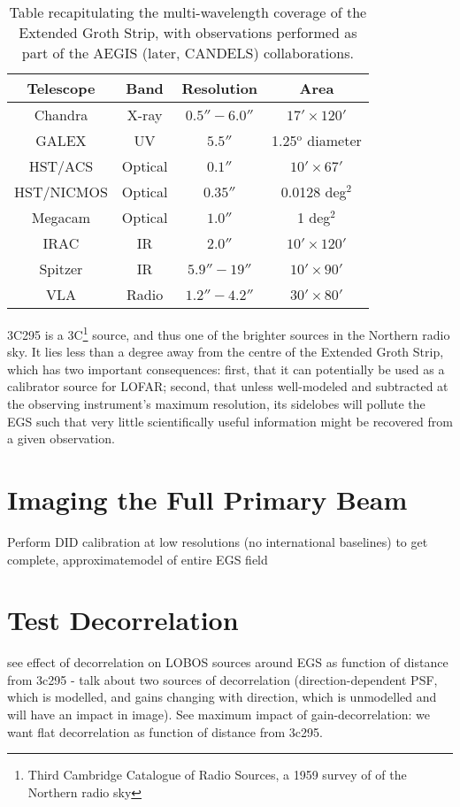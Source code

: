 \begin{table}[h!]
\begin{tabular}{cccc}
Telescope    & Band    & Resolution  & Area \\\hline
Chandra      & X-ray   & $0.5''-6.0''$ & $17'\times 120'$ \\
GALEX        & UV      & $5.5''      $ & 1.25$^\text{o}$ diameter \\
HST/ACS      & Optical & $0.1''      $ & $10' \times 67'$\\
HST/NICMOS   & Optical & $0.35''     $ & 0.0128 deg$^2$\\
Megacam      & Optical & $1.0''      $ & 1 deg$^2$\\
IRAC         & IR      & $2.0''      $ & $10' \times 120'$ \\
Spitzer      & IR      & $5.9''-19'' $ & $10'\times 90'$\\
VLA          & Radio   & $1.2''-4.2''$ & $30' \times 80'$
\end{tabular}
\caption{\label{table.EGS.observation}Table recapitulating the multi-wavelength coverage of the Extended Groth Strip, with observations performed as part of the AEGIS (later, CANDELS) collaborations.}
\end{table}

\pg
3C295 is a 3C\footnote{Third Cambridge Catalogue of Radio Sources, a 1959 survey of of the Northern radio sky} source, and thus one of the brighter sources in the Northern radio sky. It lies less than a degree away from the centre of the Extended Groth Strip, which has two important consequences: first, that it can potentially be used as a calibrator source for LOFAR; second, that unless well-modeled and subtracted at the observing instrument's maximum resolution, its sidelobes will pollute the EGS such that very little scientifically useful information might be recovered from a given observation. 

\section{Imaging the Full Primary Beam}
\pg
Perform DID calibration at low resolutions (no international baselines) to get complete, approximatemodel of entire EGS field

\section{Test Decorrelation}
\pg
see effect of decorrelation on LOBOS sources around EGS as function of distance from 3c295 - talk about two sources of decorrelation (direction-dependent PSF, which is modelled, and gains changing with direction, which is unmodelled and will have an impact in image). See maximum impact of gain-decorrelation: we want flat decorrelation as function of distance from 3c295.

